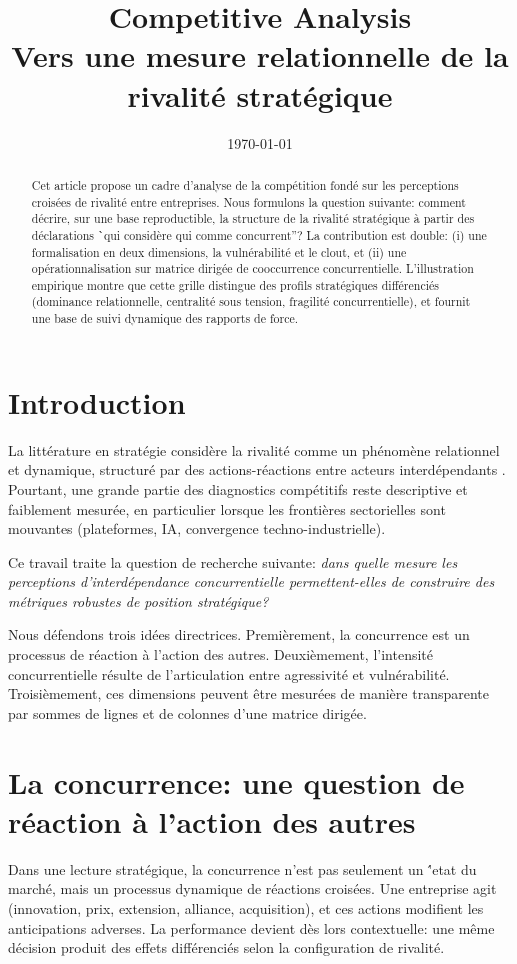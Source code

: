 \documentclass[11pt,a4paper]{article}
\title{Competitive Analysis\\\large Vers une mesure relationnelle de la rivalit\'e strat\'egique}
\author{}
\date{\today}
\begin{document}
\maketitle

\begin{abstract}
Cet article propose un cadre d'analyse de la comp\'etition fond\'e sur les perceptions crois\'ees de rivalit\'e entre entreprises. Nous formulons la question suivante: comment d\'ecrire, sur une base reproductible, la structure de la rivalit\'e strat\'egique \`a partir des d\'eclarations \``qui consid\`ere qui comme concurrent''? La contribution est double: (i) une formalisation en deux dimensions, la vuln\'erabilit\'e et le clout, et (ii) une op\'erationnalisation sur matrice dirig\'ee de cooccurrence concurrentielle. L'illustration empirique montre que cette grille distingue des profils strat\'egiques diff\'erenci\'es (dominance relationnelle, centralit\'e sous tension, fragilit\'e concurrentielle), et fournit une base de suivi dynamique des rapports de force.
\end{abstract}

\section{Introduction}
La litt\'erature en strat\'egie consid\`ere la rivalit\'e comme un ph\'enom\`ene relationnel et dynamique, structur\'e par des actions-r\'eactions entre acteurs interd\'ependants \citep{porter1980,chenmacmillan1992,chenmiller2012}. Pourtant, une grande partie des diagnostics comp\'etitifs reste descriptive et faiblement mesur\'ee, en particulier lorsque les fronti\`eres sectorielles sont mouvantes (plateformes, IA, convergence techno-industrielle).

Ce travail traite la question de recherche suivante: \emph{dans quelle mesure les perceptions d'interd\'ependance concurrentielle permettent-elles de construire des m\'etriques robustes de position strat\'egique?}

Nous d\'efendons trois id\'ees directrices. Premi\`erement, la concurrence est un processus de r\'eaction \`a l'action des autres. Deuxi\`emement, l'intensit\'e concurrentielle r\'esulte de l'articulation entre agressivit\'e et vuln\'erabilit\'e. Troisi\`emement, ces dimensions peuvent \^etre mesur\'ees de mani\`ere transparente par sommes de lignes et de colonnes d'une matrice dirig\'ee.

\section{La concurrence: une question de r\'eaction \`a l'action des autres}
Dans une lecture strat\'egique, la concurrence n'est pas seulement un \''etat du march\'e, mais un processus dynamique de r\'eactions crois\'ees. Une entreprise agit (innovation, prix, extension, alliance, acquisition), et ces actions modifient les anticipations adverses. La performance devient d\`es lors contextuelle: une m\^eme d\'ecision produit des effets diff\'erenci\'es selon la configuration de rivalit\'e.
\end{document}
